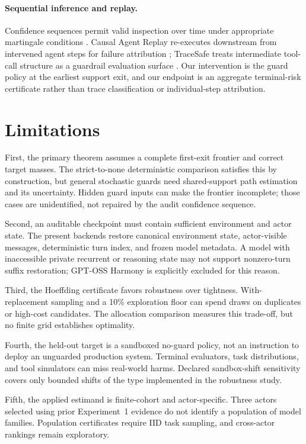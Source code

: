 \documentclass{article}
\begin{document}
\paragraph{Sequential inference and replay.}
Confidence sequences permit valid inspection over time under appropriate martingale conditions
\citep{howard2021confidence}. Causal Agent Replay re-executes downstream from intervened agent
steps for failure attribution \citep{shah2026causalreplay}; TraceSafe treats intermediate
tool-call structure as a guardrail evaluation surface \citep{chen2026tracesafe}. Our intervention
is the guard policy at the earliest support exit, and our endpoint is an aggregate terminal-risk
certificate rather than trace classification or individual-step attribution.

\section{Limitations}
\label{sec:limitations}

First, the primary theorem assumes a complete first-exit frontier and correct target masses. The
strict-to-none deterministic comparison satisfies this by construction, but general stochastic
guards need shared-support path estimation and its uncertainty. Hidden guard inputs can make the
frontier incomplete; those cases are unidentified, not repaired by the audit confidence sequence.

Second, an auditable checkpoint must contain sufficient environment and actor state. The present
backends restore canonical environment state, actor-visible messages, deterministic turn index,
and frozen model metadata. A model with inaccessible private recurrent or reasoning state may not
support nonzero-turn suffix restoration; GPT-OSS Harmony is explicitly excluded for this reason.

Third, the Hoeffding certificate favors robustness over tightness. With-replacement sampling and a
10\% exploration floor can spend draws on duplicates or high-cost candidates. The allocation
comparison measures this trade-off, but no finite grid establishes optimality.

Fourth, the held-out target is a sandboxed no-guard policy, not an instruction to deploy an
unguarded production system. Terminal evaluators, task distributions, and tool simulators can
miss real-world harms. Declared sandbox-shift sensitivity covers only bounded shifts of the type
implemented in the robustness study.

Fifth, the applied estimand is finite-cohort and actor-specific. Three actors selected using prior
Experiment~1 evidence do not identify a population of model families. Population certificates
require IID task sampling, and cross-actor rankings remain exploratory.
\end{document}
